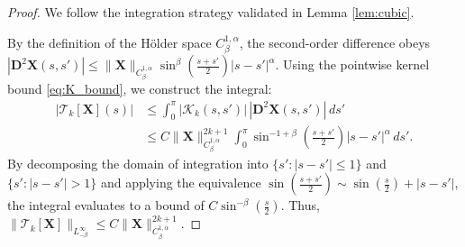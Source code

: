 \documentclass{amsart}
\begin{document}
\begin{proof}
We follow the integration strategy validated in Lemma \ref{lem:cubic}. 

By the definition of the Hölder space $C^{1,\alpha}_\beta$, the second-order difference obeys $|\mathbf{D}^2\mathbf{X}(s,s')| \le \|\mathbf{X}\|_{C^{1,\alpha}_\beta} \sin^\beta(\frac{s+s'}{2}) |s-s'|^\alpha$. Using the pointwise kernel bound \eqref{eq:K_bound}, we construct the integral:
\begin{align*}
|\mathcal{T}_k[\mathbf{X}](s)| &\le \int_0^\pi |\mathcal{K}_k(s,s')| \, |\mathbf{D}^2\mathbf{X}(s,s')| \, ds' \\
&\le C \|\mathbf{X}\|_{C^{1,\alpha}_\beta}^{2k+1} \int_0^\pi \sin^{-1+\beta}\left(\frac{s+s'}{2}\right) |s-s'|^\alpha \, ds'.
\end{align*}
By decomposing the domain of integration into $\{s' : |s-s'| \le 1\}$ and $\{s' : |s-s'| > 1\}$ and applying the equivalence $\sin(\frac{s+s'}{2}) \sim \sin(\frac{s}{2}) + |s-s'|$, the integral evaluates to a bound of $C \sin^{-\beta}(\frac{s}{2})$. Thus, $\|\mathcal{T}_k[\mathbf{X}]\|_{L^\infty_{-\beta}} \le C \|\mathbf{X}\|_{C^{1,\alpha}_\beta}^{2k+1}$.


\end{proof}
\end{document}
